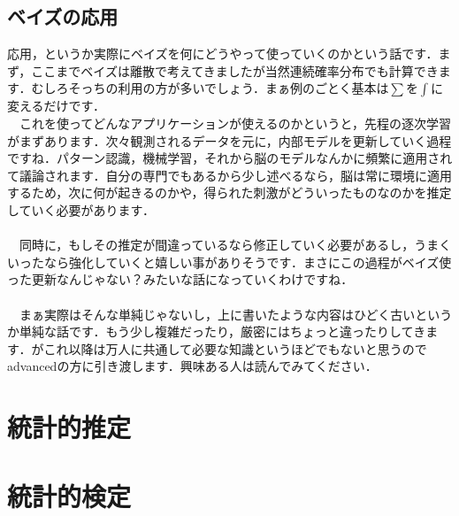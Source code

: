 \documentclass[11pt,a4paper]{jsarticle}                    %
\begin{document}
\subsection{ベイズの応用}
応用，というか実際にベイズを何にどうやって使っていくのかという話です．まず，ここまでベイズは離散で考えてきましたが当然連続確率分布でも計算できます．むしろそっちの利用の方が多いでしょう．まぁ例のごとく基本は$\sum$を$\int$に変えるだけです．\\
　これを使ってどんなアプリケーションが使えるのかというと，先程の逐次学習がまずあります．次々観測されるデータを元に，内部モデルを更新していく過程ですね．パターン認識，機械学習，それから脳のモデルなんかに頻繁に適用されて議論されます．自分の専門でもあるから少し述べるなら，脳は常に環境に適用するため，次に何が起きるのかや，得られた刺激がどういったものなのかを推定していく必要があります．\\
\\
　同時に，もしその推定が間違っているなら修正していく必要があるし，うまくいったなら強化していくと嬉しい事がありそうです．まさにこの過程がベイズ使った更新なんじゃない？みたいな話になっていくわけですね．\\
\\
　まぁ実際はそんな単純じゃないし，上に書いたような内容はひどく古いというか単純な話です．もう少し複雑だったり，厳密にはちょっと違ったりしてきます．がこれ以降は万人に共通して必要な知識というほどでもないと思うのでadvancedの方に引き渡します．興味ある人は読んでみてください．
\section{統計的推定}
\section{統計的検定}
\end{document}
